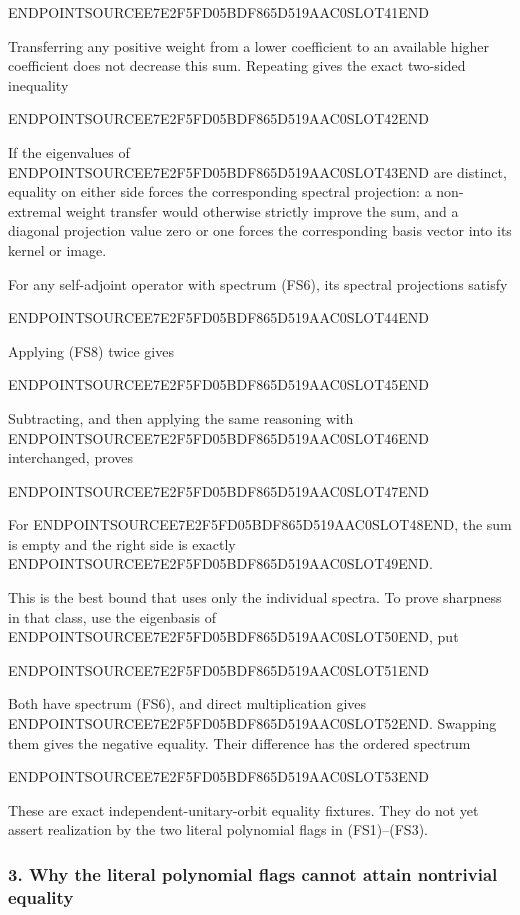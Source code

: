ENDPOINTSOURCEE7E2F5FD05BDF865D519AAC0SLOT41END

Transferring any positive weight from a lower coefficient to an available higher coefficient does not decrease this sum. Repeating gives the exact two-sided inequality

ENDPOINTSOURCEE7E2F5FD05BDF865D519AAC0SLOT42END

If the eigenvalues of ENDPOINTSOURCEE7E2F5FD05BDF865D519AAC0SLOT43END are distinct, equality on either side forces the corresponding spectral projection: a non-extremal weight transfer would otherwise strictly improve the sum, and a diagonal projection value zero or one forces the corresponding basis vector into its kernel or image.

For any self-adjoint operator with spectrum (FS6), its spectral projections satisfy

ENDPOINTSOURCEE7E2F5FD05BDF865D519AAC0SLOT44END

Applying (FS8) twice gives

ENDPOINTSOURCEE7E2F5FD05BDF865D519AAC0SLOT45END

Subtracting, and then applying the same reasoning with ENDPOINTSOURCEE7E2F5FD05BDF865D519AAC0SLOT46END interchanged, proves

ENDPOINTSOURCEE7E2F5FD05BDF865D519AAC0SLOT47END

For ENDPOINTSOURCEE7E2F5FD05BDF865D519AAC0SLOT48END, the sum is empty and the right side is exactly ENDPOINTSOURCEE7E2F5FD05BDF865D519AAC0SLOT49END.

This is the best bound that uses only the individual spectra. To prove sharpness in that class, use the eigenbasis of ENDPOINTSOURCEE7E2F5FD05BDF865D519AAC0SLOT50END, put

ENDPOINTSOURCEE7E2F5FD05BDF865D519AAC0SLOT51END

Both have spectrum (FS6), and direct multiplication gives ENDPOINTSOURCEE7E2F5FD05BDF865D519AAC0SLOT52END. Swapping them gives the negative equality. Their difference has the ordered spectrum

ENDPOINTSOURCEE7E2F5FD05BDF865D519AAC0SLOT53END

These are exact independent-unitary-orbit equality fixtures. They do not yet assert realization by the two literal polynomial flags in (FS1)--(FS3).

\subsubsection{3. Why the literal polynomial flags cannot attain nontrivial equality}\label{endpoint-four_window_sharpness--why-the-literal-polynomial-flags-cannot-attain-nontrivial-equality}

